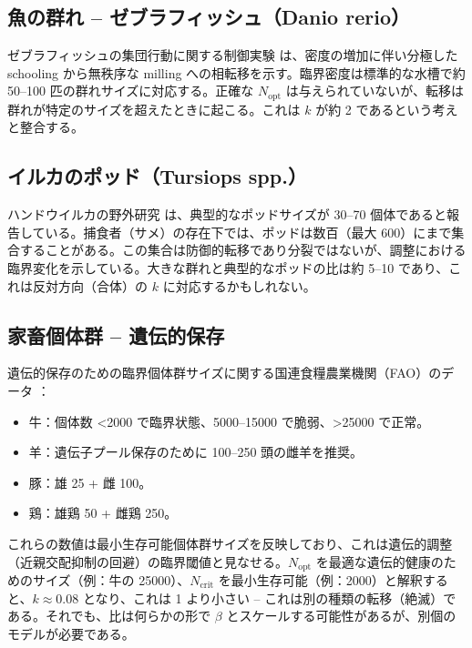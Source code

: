 \documentclass[12pt]{article}
\theoremstyle{remark}
\begin{document}
	\subsection{魚の群れ – ゼブラフィッシュ（Danio rerio）}
	\label{subsec:fish}
	
	ゼブラフィッシュの集団行動に関する制御実験 \cite{Tunstrom2013} は、密度の増加に伴い分極した schooling から無秩序な milling への相転移を示す。臨界密度は標準的な水槽で約 50–100 匹の群れサイズに対応する。正確な \(N_{\text{opt}}\) は与えられていないが、転移は群れが特定のサイズを超えたときに起こる。これは \(k\) が約 2 であるという考えと整合する。
	
	\subsection{イルカのポッド（Tursiops spp.）}
	\label{subsec:dolphins}
	
	ハンドウイルカの野外研究 \cite{Connor2000} は、典型的なポッドサイズが 30–70 個体であると報告している。捕食者（サメ）の存在下では、ポッドは数百（最大 600）にまで集合することがある。この集合は防御的転移であり分裂ではないが、調整における臨界変化を示している。大きな群れと典型的なポッドの比は約 5–10 であり、これは反対方向（合体）の \(k\) に対応するかもしれない。
	
	\subsection{家畜個体群 – 遺伝的保存}
	\label{subsec:livestock}
	
	遺伝的保存のための臨界個体群サイズに関する国連食糧農業機関（FAO）のデータ \cite{FAO2013}：
	\begin{itemize}
		\item 牛：個体数 <2000 で臨界状態、5000–15000 で脆弱、>25000 で正常。
		\item 羊：遺伝子プール保存のために 100–250 頭の雌羊を推奨。
		\item 豚：雄 25 + 雌 100。
		\item 鶏：雄鶏 50 + 雌鶏 250。
	\end{itemize}
	これらの数値は最小生存可能個体群サイズを反映しており、これは遺伝的調整（近親交配抑制の回避）の臨界閾値と見なせる。\(N_{\text{opt}}\) を最適な遺伝的健康のためのサイズ（例：牛の 25000）、\(N_{\text{crit}}\) を最小生存可能（例：2000）と解釈すると、\(k \approx 0.08\) となり、これは 1 より小さい – これは別の種類の転移（絶滅）である。それでも、比は何らかの形で \(\beta\) とスケールする可能性があるが、別個のモデルが必要である。
	
\end{document}
